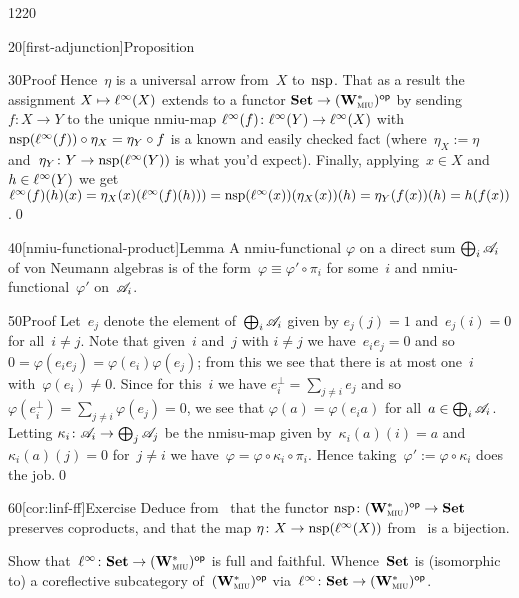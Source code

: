 \begin{parsec}{1220}
\begin{point}{20}[first-adjunction]{Proposition}
\begin{point}{30}{Proof}
Hence~$\eta$ is a universal arrow from~$X$
to~$\mathrm{nsp}$.
That as a result the assignment $X\mapsto \ell^\infty(X)$
extends to a functor
$\mathbf{Set}\to{(\mathbf{W}^*_{\text{\textsc{miu}}})}{^{\mathsf{op}}}$
by sending~$f\colon X\to Y$
to the unique nmiu-map $\ell^\infty(f)\colon \ell^\infty(Y)\to\ell^\infty(X)$
with $\mathrm{nsp}(\ell^\infty(f))\circ \eta_X = \eta_Y\circ f$
is a known and easily checked fact
(where~$\eta_X:= \eta$ and~$\eta_Y\colon Y\to\mathrm{nsp}(\ell^\infty(Y))$ 
is what you'd expect).
Finally, applying~$x\in X$ and~$h\in \ell^\infty(Y)$
we get
$ \ell^\infty(f)(h)(x)
= \eta_X(x)(\ell^\infty(f)(h)))
=\mathrm{nsp}(\ell^\infty(x))(\eta_X(x))(h)
=\eta_Y(f(x))(h)
=h(f(x))$.\qed
\end{point}
\end{point}
\begin{point}{40}[nmiu-functional-product]{Lemma}%
A nmiu-functional $\varphi$
on a direct sum $\bigoplus_i \mathscr{A}_i$
of von Neumann algebras
is of the form~$\varphi\equiv \varphi'\circ \pi_i$
for some~$i$ and nmiu-functional~$\varphi'$ on~$\mathscr{A}_i$.
\begin{point}{50}{Proof}%
Let~$e_j$ denote the element of~$\bigoplus_i \mathscr{A}_i$
given by $e_j(j)=1$ and~$e_j(i)=0$ for all~$i\neq j$.
Note that given~$i$ and~$j$ with $i\neq j$
we have~$e_ie_j=0$
and so~$0=\varphi(e_i e_j)=\varphi(e_i)\varphi(e_j)$;
from this we see that
there is at most one~$i$ with~$\varphi(e_i)\neq 0$.
Since for this~$i$
we have $e_i^\perp = \sum_{j\neq i} e_j$
and so~$\varphi(e_i^\perp)=\sum_{j\neq i} \varphi(e_j)=0$,
we see that $\varphi(a)=\varphi(e_i a )$
for all~$a\in \bigoplus_i \mathscr{A}_i$.
Letting  $\kappa_i\colon \mathscr{A}_i\to\bigoplus_j \mathscr{A}_j$
be the nmisu-map given by~$\kappa_i(a)(i)=a$
and~$\kappa_i(a)(j)=0$ for~$j\neq i$
we have~$\varphi = \varphi \circ \kappa_i \circ \pi_i$.
Hence taking~$\varphi':=\varphi\circ \kappa_i$
does the job.\qed
\end{point}
\end{point}
\begin{point}{60}[cor:linf-ff]{Exercise}%
Deduce from~
that the functor $\mathrm{nsp}\colon {(\mathbf{W}^*_{\text{\textsc{miu}}})}{^{\mathsf{op}}}\to \mathbf{Set}$
preserves coproducts,
and that the 
map $\eta\colon X\to \mathrm{nsp}(\ell^\infty(X))$
from~ is a bijection.

Show that~$\ell^\infty\colon\mathbf{Set}\to {(\mathbf{W}^*_{\text{\textsc{miu}}})}{^{\mathsf{op}}}$
is full and faithful.
	Whence~$\mathbf{Set}$ is (isomorphic to)  
a coreflective subcategory of~${(\mathbf{W}^*_{\text{\textsc{miu}}})}{^{\mathsf{op}}}$ 
	via~$\ell^\infty\colon \mathbf{Set} \to {(\mathbf{W}^*_{\text{\textsc{miu}}})}{^{\mathsf{op}}}$.
\end{point}
\end{parsec}
